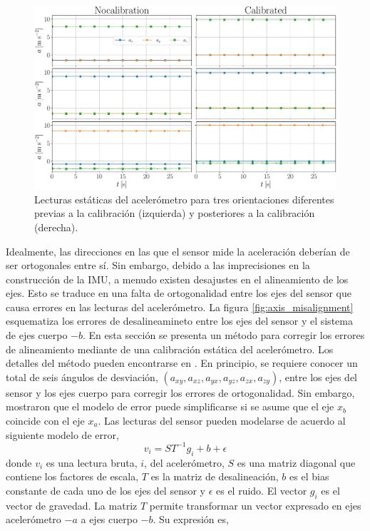 \documentclass[a4paper,12pt]{book}
\begin{document}
\begin{figure}[!h]
    \centering
	\includegraphics[width=0.9\linewidth]{accel_cal.pdf}
 	\caption{Lecturas estáticas del acelerómetro para tres orientaciones diferentes previas a la calibración (izquierda) y posteriores a la calibración (derecha).}
 	\label{fig:accel_cal}
\end{figure}
Idealmente, las direcciones en las que el sensor mide la aceleración deberían de ser ortogonales entre sí. Sin embargo, debido a las imprecisiones en la construcción de la IMU, a menudo existen desajustes en el alineamiento de los ejes. Esto se traduce en una falta de ortogonalidad entre los ejes del sensor que causa errores en las lecturas del acelerómetro. La figura \ref{fig:axis_misalignment} esquematiza los errores de desalineamineto entre los ejes del sensor y el sistema de ejes cuerpo $-b$. En esta sección se presenta un método para corregir los errores de alineamiento mediante de una calibración estática del acelerómetro. Los detalles del método pueden encontrarse en \cite{tee2011triaxial}. En principio, se requiere conocer un total de seis ángulos de desviación, $(a_{xy},  a_{xz}, a_{yx}, a_{yz}, a_{zx}, a_{zy})$, entre los ejes del sensor y los ejes cuerpo para corregir los errores de ortogonalidad. Sin embargo, \cite{skog2006calibration} mostraron que el modelo de error puede simplificarse si se asume que el eje $x_b$ coincide con el eje $x_a$. Las lecturas del sensor pueden modelarse de acuerdo al siguiente modelo de error,
\begin{equation}\label{eq:acc_calibration}
    v_i = ST^{-1}g_i + b + \epsilon
\end{equation}
donde $v_i$ es una lectura bruta, $i$, del acelerómetro, $S$ es una matriz diagonal que contiene los factores de escala, $T$ es la matriz de desalineación, $b$ es el bias constante de cada uno de los ejes del sensor y $\epsilon$ es el ruido. El vector $g_i$ es el vector de gravedad. La matriz $T$  permite transformar un vector expresado en ejes acelerómetro $-a$ a ejes cuerpo $-b$. Su expresión es,
\end{document}
